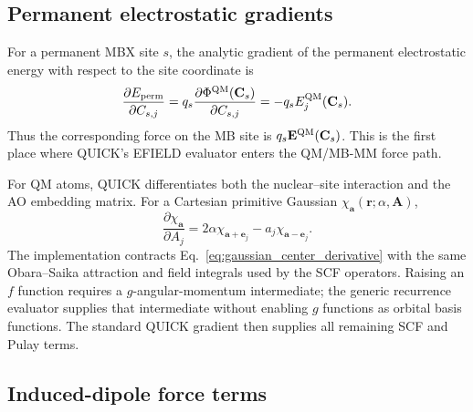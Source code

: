 \documentclass[11pt]{article}
\begin{document}
\subsection{Permanent electrostatic gradients}

For a permanent MBX site $s$, the analytic gradient of the permanent
electrostatic energy with respect to the site coordinate is
\begin{equation}
  \frac{\partial E_{\rm perm}}{\partial C_{s,j}}
  =
  q_s\frac{\partial \Phi^{\rm QM}(\mathbf{C}_s)}{\partial C_{s,j}}
  =
  -q_s E^{\rm QM}_j(\mathbf{C}_s).
  \label{eq:perm_site_gradient}
\end{equation}
Thus the corresponding force on the MB site is
$q_s\mathbf{E}^{\rm QM}(\mathbf{C}_s)$. This is the first place where
QUICK's EFIELD evaluator enters the QM/MB-MM force path.

For QM atoms, QUICK differentiates both the nuclear--site interaction and
the AO embedding matrix. For a Cartesian primitive Gaussian
$\chi_{\mathbf a}(\mathbf r;\alpha,\mathbf A)$,
\begin{equation}
  \frac{\partial\chi_{\mathbf a}}{\partial A_j}
  =2\alpha\chi_{\mathbf a+\mathbf e_j}
  -a_j\chi_{\mathbf a-\mathbf e_j}.
  \label{eq:gaussian_center_derivative}
\end{equation}
The implementation contracts Eq.~\ref{eq:gaussian_center_derivative}
with the same Obara--Saika attraction and field integrals used by the
SCF operators. Raising an $f$ function requires a $g$-angular-momentum
intermediate; the generic recurrence evaluator supplies that intermediate
without enabling $g$ functions as orbital basis functions. The standard
QUICK gradient then supplies all remaining SCF and Pulay terms.

\subsection{Induced-dipole force terms}
\end{document}

